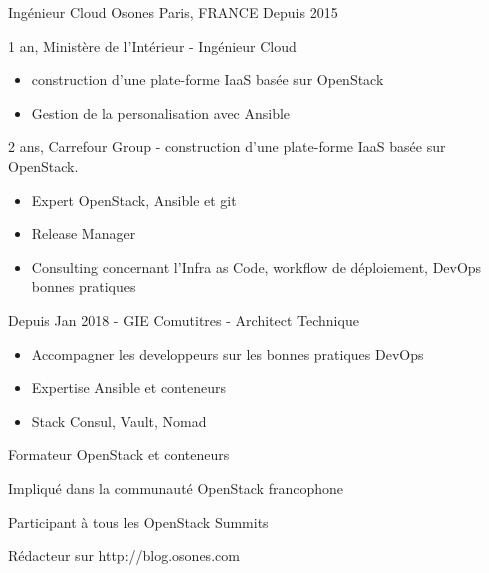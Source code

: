 

\begin{cventries}

  \cventry
    {Ingénieur Cloud} %
    {Osones} %
    {Paris, FRANCE} %
    {Depuis 2015} %
    {
      \begin{cvitems} %
        \item {1 an, Ministère de l'Intérieur - Ingénieur Cloud}
          \begin{itemize}
            \item {construction d'une plate-forme IaaS basée sur OpenStack}
            \item {Gestion de la personalisation avec Ansible}
          \end{itemize}
        \item {2 ans, Carrefour Group - construction d'une plate-forme IaaS basée sur OpenStack.}
            \begin{itemize}
              \item {Expert OpenStack, Ansible et git}
              \item {Release Manager}
              \item {Consulting concernant l'Infra as Code, workflow de déploiement, DevOps bonnes pratiques}
            \end{itemize}
        \item {Depuis Jan 2018 - GIE Comutitres - Architect Technique}
            \begin{itemize}
              \item {Accompagner les developpeurs sur les bonnes pratiques DevOps}
              \item {Expertise Ansible et conteneurs}
              \item {Stack Consul, Vault, Nomad}
            \end{itemize}
        \item {Formateur OpenStack et conteneurs}
        \item {Impliqué dans la communauté OpenStack francophone}
        \item {Participant à tous les OpenStack Summits}
        \item {Rédacteur sur http://blog.osones.com}
      \end{cvitems}
    }


\end{cventries}
